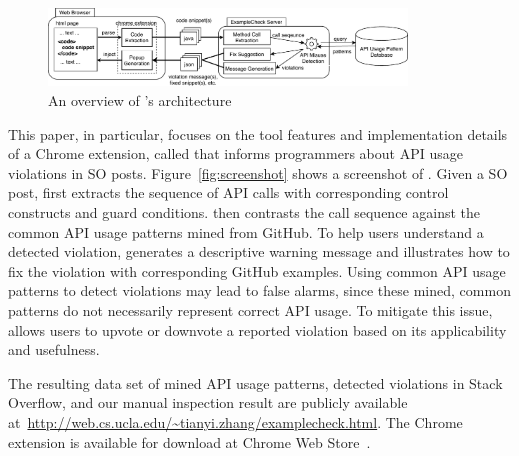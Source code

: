 \begin{figure}[!th]
\centering
\includegraphics[width=0.85\textwidth]{examplecheck-extension.pdf}
\caption{An overview of {\tool}'s architecture}
\label{fig:arch}
\end{figure}

This paper, in particular, focuses on the tool features and implementation details of a Chrome extension, called {\tool} that informs programmers about API usage violations in SO posts. Figure~\ref{fig:screenshot} shows a screenshot of {\tool}. Given a SO post, {\tool} first extracts the sequence of API calls with corresponding control constructs and guard conditions. {\tool} then contrasts the call sequence against the common API usage patterns mined from GitHub. To help users understand a detected violation, {\tool} generates a descriptive warning message and illustrates how to fix the violation with corresponding GitHub examples. Using common API usage patterns to detect violations may lead to false alarms, since these mined, common patterns do not necessarily represent correct API usage. To mitigate this issue, {\tool} allows users to upvote or downvote a reported violation based on its applicability and usefulness. 

The resulting data set of mined API usage patterns, detected violations in Stack Overflow, and our manual inspection result are publicly available at~{\small\url{http://web.cs.ucla.edu/~tianyi.zhang/examplecheck.html}}. The Chrome extension is available for download at Chrome Web Store~\cite{examplecheck}.



%
